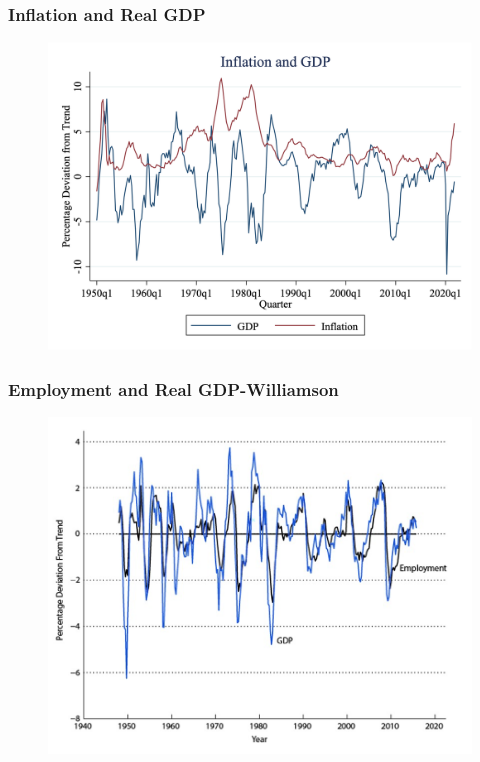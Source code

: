 \documentclass{beamer}
\begin{document}
\begin{frame}
\frametitle[alignment=center]{Inflation and Real GDP}
\begin{figure}
\centering
\includegraphics[scale=0.25]{Figures/Fig_3pt12.png}
\end{figure}
\end{frame}

\begin{frame}
\frametitle[alignment=center]{Employment and Real GDP-Williamson}
\begin{figure}
\centering
\includegraphics[scale=0.5]{Figures/W_Fig_3pt13.png}
\end{figure}
\end{frame}
\end{document}
